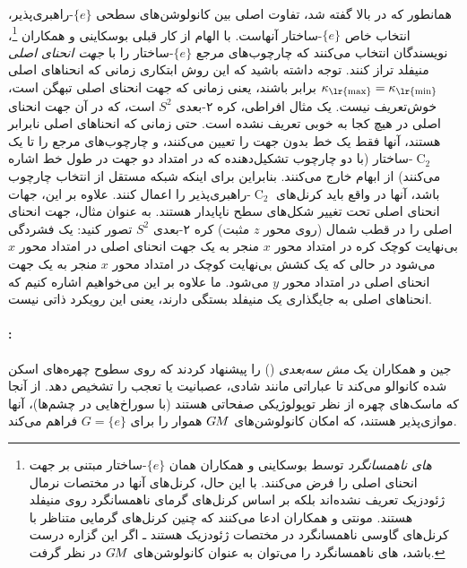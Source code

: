 همانطور که در بالا گفته شد، تفاوت اصلی بین کانولوشن‌های سطحی $\{e\}$-راهبری‌پذیر، انتخاب خاص $\{e\}$-ساختار آنهاست.
با الهام از کار قبلی بوسکاینی و همکاران\cite{boscaini2016learning}%
\footnote{
	\emph{های ناهمسانگرد} توسط بوسکاینی و همکاران\cite{boscaini2016learning} همان $\{e\}$-ساختار مبتنی بر جهت انحنای اصلی را فرض می‌کنند.
	با این حال، کرنل‌های آنها در مختصات نرمال ژئودزیک تعریف نشده‌اند بلکه بر اساس کرنل‌های گرمای ناهمسانگرد روی منیفلد هستند.
	مونتی و همکاران\cite{monti2017geometric} ادعا می‌کنند که چنین کرنل‌های گرمایی متناظر با کرنل‌های گاوسی ناهمسانگرد در مختصات ژئودزیک هستند ـ اگر این گزاره درست باشد، های ناهمسانگرد را می‌توان به عنوان کانولوشن‌های $G\mkern-1.4muM$ در نظر گرفت.
}،
نویسندگان انتخاب می‌کنند که چارچوب‌های مرجع $\{e\}$-ساختار را با \emph{جهت انحنای اصلی} منیفلد تراز کنند.
توجه داشته باشید که این روش ابتکاری زمانی که انحناهای اصلی $\kappa_{\textup{\lr{max}}} = \kappa_{\textup{\lr{min}}}$ برابر باشند، یعنی زمانی که جهت انحنای اصلی تبهگن است، خوش‌تعریف نیست.
یک مثال افراطی، کره ۲-بعدی $S^2$ است، که در آن جهت انحنای اصلی در هیچ کجا به خوبی تعریف نشده است.
حتی زمانی که انحناهای اصلی نابرابر هستند، آنها فقط یک خط بدون جهت را تعیین می‌کنند، و چارچوب‌های مرجع را تا یک $\operatorname{C}_2$-ساختار (با دو چارچوب تشکیل‌دهنده که در امتداد دو جهت در طول خط اشاره می‌کنند) از ابهام خارج می‌کنند.
بنابراین برای اینکه شبکه مستقل از انتخاب چارچوب باشد، آنها در واقع باید کرنل‌های $\operatorname{C}_2$-راهبری‌پذیر را اعمال کنند.
علاوه بر این، جهات انحنای اصلی تحت تغییر شکل‌های سطح ناپایدار هستند.
به عنوان مثال، جهت انحنای اصلی را در قطب شمال (روی محور $z$ مثبت) کره ۲-بعدی $S^2$ تصور کنید:
یک فشردگی بی‌نهایت کوچک کره در امتداد محور $x$ منجر به یک جهت انحنای اصلی در امتداد محور $x$ می‌شود در حالی که یک کشش بی‌نهایت کوچک در امتداد محور $x$ منجر به یک جهت انحنای اصلی در امتداد محور $y$ می‌شود.
ما علاوه بر این می‌خواهیم اشاره کنیم که انحناهای اصلی به جایگذاری یک منیفلد بستگی دارند، یعنی این رویکرد ذاتی نیست.





\paragraph{:}
جین و همکاران \cite{jin2018learning} یک \emph{ مش سه‌بعدی} () را پیشنهاد کردند که روی سطوح چهره‌های اسکن شده کانوالو می‌کند تا عباراتی مانند شادی، عصبانیت یا تعجب را تشخیص دهد.
از آنجا که ماسک‌های چهره از نظر توپولوژیکی صفحاتی هستند (با سوراخ‌هایی در چشم‌ها)، آنها موازی‌پذیر هستند، که امکان کانولوشن‌های $G\mkern-1.4muM$ هموار را برای ${G=\{e\}}$ فراهم می‌کند.

